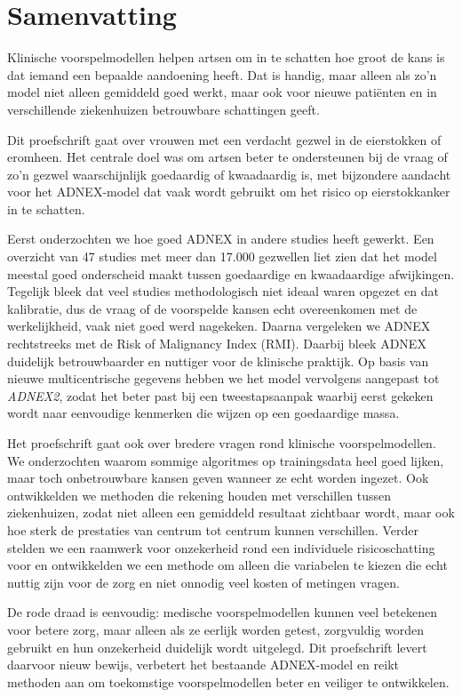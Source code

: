 \chapter*{Samenvatting}

Klinische voorspelmodellen helpen artsen om in te schatten hoe groot de kans is dat iemand een bepaalde aandoening heeft. Dat is handig, maar alleen als zo'n model niet alleen gemiddeld goed werkt, maar ook voor nieuwe patiënten en in verschillende ziekenhuizen betrouwbare schattingen geeft.

Dit proefschrift gaat over vrouwen met een verdacht gezwel in de eierstokken of eromheen. Het centrale doel was om artsen beter te ondersteunen bij de vraag of zo'n gezwel waarschijnlijk goedaardig of kwaadaardig is, met bijzondere aandacht voor het \gls{ADNEX}-model dat vaak wordt gebruikt om het risico op eierstokkanker in te schatten.

Eerst onderzochten we hoe goed \gls{ADNEX} in andere studies heeft gewerkt. Een overzicht van 47 studies met meer dan 17.000 gezwellen liet zien dat het model meestal goed onderscheid maakt tussen goedaardige en kwaadaardige afwijkingen. Tegelijk bleek dat veel studies methodologisch niet ideaal waren opgezet en dat kalibratie, dus de vraag of de voorspelde kansen echt overeenkomen met de werkelijkheid, vaak niet goed werd nagekeken. Daarna vergeleken we \gls{ADNEX} rechtstreeks met de Risk of Malignancy Index (\gls{RMI}). Daarbij bleek \gls{ADNEX} duidelijk betrouwbaarder en nuttiger voor de klinische praktijk. Op basis van nieuwe multicentrische gegevens hebben we het model vervolgens aangepast tot \emph{ADNEX2}, zodat het beter past bij een tweestapsaanpak waarbij eerst gekeken wordt naar eenvoudige kenmerken die wijzen op een goedaardige massa.


Het proefschrift gaat ook over bredere vragen rond klinische voorspelmodellen. We onderzochten waarom sommige algoritmes op trainingsdata heel goed lijken, maar toch onbetrouwbare kansen geven wanneer ze echt worden ingezet. Ook ontwikkelden we methoden die rekening houden met verschillen tussen ziekenhuizen, zodat niet alleen een gemiddeld resultaat zichtbaar wordt, maar ook hoe sterk de prestaties van centrum tot centrum kunnen verschillen. Verder stelden we een raamwerk voor onzekerheid rond een individuele risicoschatting voor en ontwikkelden we een methode om alleen die variabelen te kiezen die echt nuttig zijn voor de zorg en niet onnodig veel kosten of metingen vragen.

De rode draad is eenvoudig: medische voorspelmodellen kunnen veel betekenen voor betere zorg, maar alleen als ze eerlijk worden getest, zorgvuldig worden gebruikt en hun onzekerheid duidelijk wordt uitgelegd. Dit proefschrift levert daarvoor nieuw bewijs, verbetert het bestaande \gls{ADNEX}-model en reikt methoden aan om toekomstige voorspelmodellen beter en veiliger te ontwikkelen.